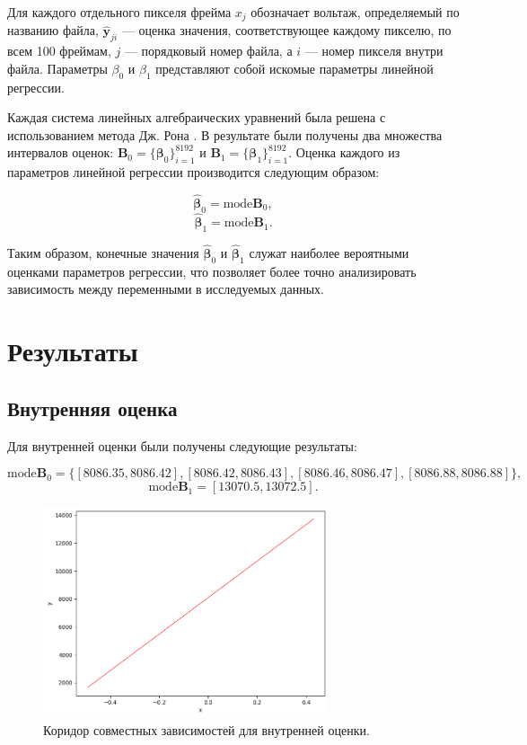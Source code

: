 \documentclass{article}
\begin{document}
  Для каждого отдельного пикселя фрейма \( x_j \) обозначает вольтаж,
  определяемый по названию файла, \( \hat{\mathbf{y}}_{ji} \) --- оценка
  значения, соответствующее каждому пикселю, по всем 100 фреймам,
  \( j \) --- порядковый номер файла, а \( i \) --- номер пикселя внутри
  файла. Параметры \( \beta_0 \) и \( \beta_1 \) представляют собой искомые
  параметры линейной регрессии.

  Каждая система линейных алгебраических уравнений была решена с
  использованием метода Дж. Рона \cite{rohn}. В результате были получены
  два множества интервалов оценок:
  \( \mathbf{B}_0 = \{ \mathbf{\beta}_0 \}_{i=1}^{8192} \)
  и \( \mathbf{B}_1 = \{ \mathbf{\beta}_1 \}_{i=1}^{8192} \). Оценка каждого
  из параметров линейной регрессии производится следующим образом:

  \[ \hat{\mathbf{\beta}}_0 = \text{mode} \mathbf{B}_0, \]
  \[ \hat{\mathbf{\beta}}_1 = \text{mode} \mathbf{B}_1. \]

  Таким образом, конечные значения \( \hat{\mathbf{\beta}}_0 \) и
  \( \hat{\mathbf{\beta}}_1 \) служат наиболее вероятными оценками
  параметров регрессии, что позволяет более точно анализировать
  зависимость между переменными в исследуемых данных.

  \section{Результаты}

  \subsection{Внутренняя оценка}

  Для внутренней оценки были получены следующие результаты:

  \[
    \text{mode} \mathbf{B}_0
      = \{ [8086.35, 8086.42], [8086.42, 8086.43], [8086.46, 8086.47], [8086.88, 8086.88] \},
  \]
  \[
    \text{mode} \mathbf{B}_1 = [13070.5, 13072.5].
  \]

  \begin{figure}[htbp!]
		\begin{center}
			\includegraphics[width = 0.75\textwidth]{int_est}
			\caption{Коридор совместных зависимостей для внутренней оценки.}
      \label{figure:int_est}
		\end{center}
	\end{figure}
\end{document}
